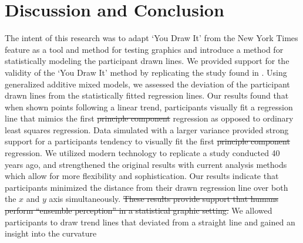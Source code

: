 \documentclass[12pt]{article}
\providecommand{\DIFaddtex}[1]{{\protect\color{blue}\uwave{#1}}} %
\providecommand{\DIFdeltex}[1]{{\protect\color{red}\sout{#1}}}                      %
\providecommand{\DIFaddbegin}{} %
\providecommand{\DIFaddend}{} %
\providecommand{\DIFdelbegin}{} %
\providecommand{\DIFdelend}{} %
\providecommand{\DIFadd}[1]{\texorpdfstring{\DIFaddtex{#1}}{#1}} %
\providecommand{\DIFdel}[1]{\texorpdfstring{\DIFdeltex{#1}}{}} %
\newcommand{\DIFscaledelfig}{0.5}
\newlength{\DIFdelgraphicswidth} %
\newlength{\DIFdelgraphicsheight} %
\newcommand{\DIFaddincludegraphics}[2][]{{\color{blue}\fbox{\DIFOincludegraphics[#1]{#2}}}} %
\newcommand{\DIFdelincludegraphics}[2][]{%
\sbox{\DIFdelgraphicsbox}{\DIFOincludegraphics[#1]{#2}}%
\settoboxwidth{\DIFdelgraphicswidth}{\DIFdelgraphicsbox} %
\settoboxtotalheight{\DIFdelgraphicsheight}{\DIFdelgraphicsbox} %
\scalebox{\DIFscaledelfig}{%
\parbox[b]{\DIFdelgraphicswidth}{\usebox{\DIFdelgraphicsbox}\\[-\baselineskip] \rule{\DIFdelgraphicswidth}{0em}}\llap{\resizebox{\DIFdelgraphicswidth}{\DIFdelgraphicsheight}{%
\setlength{\unitlength}{\DIFdelgraphicswidth}%
\begin{picture}(1,1)%
\thicklines\linethickness{2pt} %
{\color[rgb]{1,0,0}\put(0,0){\framebox(1,1){}}}%
{\color[rgb]{1,0,0}\put(0,0){\line( 1,1){1}}}%
{\color[rgb]{1,0,0}\put(0,1){\line(1,-1){1}}}%
\end{picture}%
}\hspace*{3pt}}} %
} %
\DeclareRobustCommand{\DIFaddbegin}{\DIFOaddbegin \let\includegraphics\DIFaddincludegraphics} %
\DeclareRobustCommand{\DIFaddend}{\DIFOaddend \let\includegraphics\DIFOincludegraphics} %
\DeclareRobustCommand{\DIFdelbegin}{\DIFOdelbegin \let\includegraphics\DIFdelincludegraphics} %
\DeclareRobustCommand{\DIFdelend}{\DIFOaddend \let\includegraphics\DIFOincludegraphics} %
\begin{document}
\DIFdelbegin %
\DIFdelend \DIFaddbegin \hypertarget{conclusion-discussion}{%
\section{Discussion and Conclusion}\label{conclusion-discussion}}
\DIFaddend 

The intent of this research was to adapt `You Draw It' from the New York
Times feature as a tool and method for testing graphics and introduce a
method for statistically modeling the participant drawn lines. We
provided support for the validity of the `You Draw It' method by
replicating the study found in \citet{mosteller1981eye}. Using
generalized additive mixed models, we assessed the deviation of the
participant drawn lines from the statistically fitted regression lines.
Our results found that when shown points following a linear trend,
participants visually fit a regression line that mimics the first
\DIFdelbegin \DIFdel{principle component }\DIFdelend \DIFaddbegin \DIFadd{principal axis }\DIFaddend regression as opposed to ordinary least squares
regression. Data simulated with a larger variance provided strong
support for a participants tendency to visually fit the first \DIFdelbegin \DIFdel{principle
component }\DIFdelend \DIFaddbegin \DIFadd{principal
axis }\DIFaddend regression. We utilized modern technology to replicate a study
conducted 40 years ago, and strengthened the original results with
current analysis methods which allow for more flexibility and
sophistication. Our results indicate that participants minimized the
distance from their drawn regression line over both the \(x\) and \(y\)
axis simultaneously. \DIFdelbegin \DIFdel{These results provide support that humans perform
``ensemble perception'' in a statistical graphic setting. }\DIFdelend We allowed participants to draw trend lines that
deviated from a straight line and gained an insight into the curvature
\end{document}
